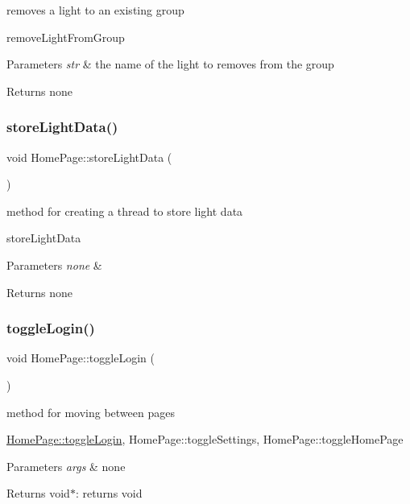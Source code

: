 removes a light to an existing group 

remove\+Light\+From\+Group 
\begin{DoxyParams}{Parameters}
{\em str} & the name of the light to removes from the group \\
\hline
\end{DoxyParams}
\begin{DoxyReturn}{Returns}
none 
\end{DoxyReturn}
\mbox{\label{class_home_page_a0b2d780662f8946abb173e1f3fe136d7}} 
\subsubsection{\texorpdfstring{store\+Light\+Data()}{storeLightData()}}
{\footnotesize\ttfamily void Home\+Page\+::store\+Light\+Data (\begin{DoxyParamCaption}{ }\end{DoxyParamCaption})}



method for creating a thread to store light data 

store\+Light\+Data 
\begin{DoxyParams}{Parameters}
{\em none} & \\
\hline
\end{DoxyParams}
\begin{DoxyReturn}{Returns}
none 
\end{DoxyReturn}
\mbox{\label{class_home_page_a3823da7245637b5b16eec173660661fc}} 
\subsubsection{\texorpdfstring{toggle\+Login()}{toggleLogin()}}
{\footnotesize\ttfamily void Home\+Page\+::toggle\+Login (\begin{DoxyParamCaption}{ }\end{DoxyParamCaption})\hspace{0.3cm}{\ttfamily [private]}}



method for moving between pages 

\hyperlink{class_home_page_a3823da7245637b5b16eec173660661fc}{Home\+Page\+::toggle\+Login}, Home\+Page\+::toggle\+Settings, Home\+Page\+::toggle\+Home\+Page 
\begin{DoxyParams}{Parameters}
{\em args} & none \\
\hline
\end{DoxyParams}
\begin{DoxyReturn}{Returns}
void$\ast$\+: returns void 
\end{DoxyReturn}
\mbox{\label{class_home_page_a8c56067a3cd4dc321572a034d3135ab9}} 
